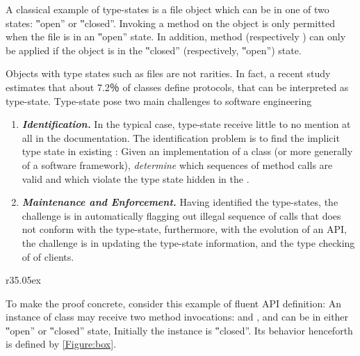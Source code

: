 A classical example of type-states is a file object which can be in one of two
states: ‟open” or ‟closed”. Invoking a  method on the object is only
permitted when the file is in an ‟open” state. In addition, method 
(respectively ) can only be applied if the object is in the
‟closed” (respectively, ‟open”) state.

Objects with type states such as files are not rarities.
In fact, a recent study~\cite{Beckman:2011} estimates
  that about 7.2％ of \Java classes define protocols, that can be interpreted as type-state.
Type-state pose two main challenges to software engineering
\begin{enumerate}
  \item \emph{\textbf{Identification.}}
    In the typical case, type-state
        receive little to no mention at all in the documentation.
    The identification problem is to find the implicit
    type state in existing \Java: Given an implementation of a class
    (or more generally of a software framework),
    \emph{determine} which sequences of method calls are valid and which violate the
    type state hidden in the \Java.
  \item \emph{\textbf{Maintenance and Enforcement.}}
    Having identified the type-states, the challenge is in automatically flagging out
      illegal sequence of calls that does not conform
      with the type-state, furthermore, with the
      evolution of an API, the challenge is in updating the type-state information,
      and the type checking of \Java of clients.
\end{enumerate}

\begin{wrapfigure}[9]r{35.05ex}
\caption{\label{Figure:box}Fluent API of a box object, defined by a DFA}

  
\end{wrapfigure}

To make the proof concrete, consider this example of fluent API definition:
An instance of class 
may receive two method invocations:  and ,
and can be in either ‟open” or ‟closed” state,
Initially the instance is ‟closed”.
Its behavior henceforth is defined by \cref{Figure:box}.

